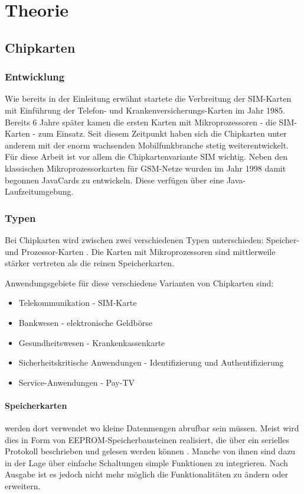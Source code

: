 \clearpage

\section{Theorie}
\label{theorie}

\subsection{Chipkarten}
\subsubsection{Entwicklung}
Wie bereits in der Einleitung erwähnt startete die Verbreitung der SIM-Karten
mit Einführung der Telefon- und Krankenversicherungs-Karten im Jahr 1985.
Bereits 6 Jahre später kamen die ersten Karten mit Mikroprozessoren - die \ac{SIM}-Karten
- zum Einsatz. Seit diesem Zeitpunkt haben sich die Chipkarten unter anderem
mit der enorm wachsenden Mobilfunkbranche stetig weiterentwickelt. Für diese
Arbeit ist vor allem die Chipkartenvariante \ac{SIM} wichtig.
Neben den klassischen Mikroprozessorkarten für \ac{GSM}-Netze wurden im Jahr
1998 damit begonnen JavaCards zu entwickeln. Diese verfügen über eine
Java-Laufzeitumgebung.

\subsubsection{Typen}
Bei Chipkarten wird zwischen zwei verschiedenen Typen unterschieden:
Speicher- und Prozessor-Karten \cite{chipkarten02}. Die Karten mit Mikroprozessoren
sind mittlerweile stärker vertreten als die reinen Speicherkarten.

Anwendungsgebiete für diese verschiedene Varianten von Chipkarten sind:
\begin{itemize}
\item Telekommunikation - \ac{SIM}-Karte
\item Bankwesen - elektronische Geldbörse
\item Gesundheitswesen - Krankenkassenkarte
\item Sicherheitskritische Anwendungen - Identifizierung und Authentifizierung
\item Service-Anwendungen - Pay-TV
\end{itemize}

\paragraph{Speicherkarten} werden dort verwendet wo kleine Datenmengen abrufbar
sein müssen. Meist wird dies in Form von \ac{EEPROM}-Speicherbausteinen realisiert,
die über ein serielles Protokoll beschrieben und gelesen werden können \cite{spitz11}.
Manche von ihnen sind dazu in der Lage über einfache Schaltungen simple Funktionen
zu integrieren. Nach Ausgabe ist es jedoch nicht mehr möglich die Funktionalitäten
zu ändern oder erweitern.


